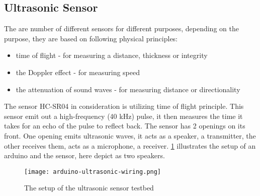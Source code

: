 \subsection{Ultrasonic Sensor}\label{sub:ultrasonic}
The are number of different sensors for different purposes, depending on the purpose, they are based on following physical principles:
\begin{itemize}
  \item time of flight - for measuring a distance, thickness or integrity\cite{ultrasound2}
  \item the Doppler effect - for measuring speed\cite{ultrasound}
  \item the attenuation of sound waves - for measuring distance or directionality\cite{ultrasound}
\end{itemize}
The sensor HC-SR04 in consideration is utilizing time of flight principle. This sensor emit out a high-frequency (40 kHz) pulse, it then measures the time it takes for an echo of the pulse to reflect back. The sensor has 2 openings on its front. One opening emits ultrasonic waves, it acts as a speaker, a transmitter, the other receives them, acts as a microphone, a receiver. \cref{fig:ultrasonicwiring} illustrates the setup of an arduino and the sensor, here depict as two speakers.

\begin{figure}[htbp]
  \centering
  \texttt{[image: arduino-ultrasonic-wiring.png]}
  \caption{The setup of the ultrasonic sensor testbed}
  \label{fig:ultrasonicwiring}
\end{figure}

